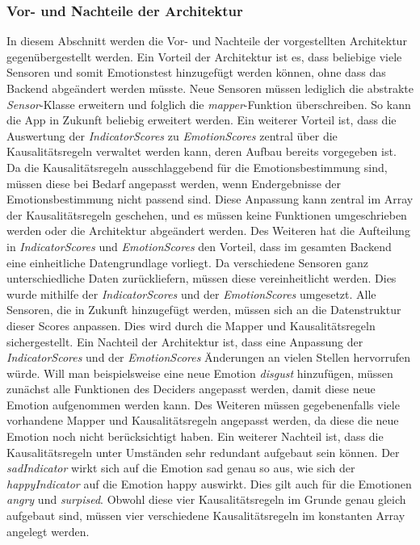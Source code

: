 \subsubsection{Vor- und Nachteile der Architektur} 
In diesem Abschnitt werden die Vor- und Nachteile der vorgestellten Architektur gegenübergestellt werden. \newline
Ein Vorteil der Architektur ist es, dass beliebige viele Sensoren und somit Emotionstest hinzugefügt werden können, ohne dass das Backend abgeändert werden müsste. Neue Sensoren müssen lediglich die abstrakte \textit{Sensor}-Klasse erweitern und folglich die \textit{mapper}-Funktion überschreiben. So kann die App in Zukunft beliebig erweitert werden. \newline
Ein weiterer Vorteil ist, dass die Auswertung der \textit{IndicatorScores} zu \textit{EmotionScores} zentral über die Kausalitätsregeln verwaltet werden kann, deren Aufbau bereits vorgegeben ist. Da die Kausalitätsregeln ausschlaggebend für die Emotionsbestimmung sind, müssen diese bei Bedarf angepasst werden, wenn Endergebnisse der Emotionsbestimmung nicht passend sind. Diese Anpassung kann zentral im Array der Kausalitätsregeln geschehen, und es müssen keine Funktionen umgeschrieben werden oder die Architektur abgeändert werden. \newline
Des Weiteren hat die Aufteilung in \textit{IndicatorScores} und \textit{EmotionScores} den Vorteil, dass im gesamten Backend eine einheitliche Datengrundlage vorliegt. Da verschiedene Sensoren ganz unterschiedliche Daten zurückliefern, müssen diese vereinheitlicht werden. Dies wurde mithilfe der \textit{IndicatorScores} und der \textit{EmotionScores} umgesetzt. Alle Sensoren, die in Zukunft hinzugefügt werden, müssen sich an die Datenstruktur dieser Scores anpassen. Dies wird durch die Mapper und Kausalitätsregeln sichergestellt. \newline
\newline
Ein Nachteil der Architektur ist, dass eine Anpassung der \textit{IndicatorScores} und der \textit{EmotionScores} Änderungen an vielen Stellen hervorrufen würde. Will man beispielsweise  eine neue Emotion \textit{disgust} hinzufügen, müssen zunächst alle Funktionen des Deciders angepasst werden, damit diese neue Emotion aufgenommen werden kann. Des Weiteren müssen gegebenenfalls viele vorhandene Mapper und Kausalitätsregeln angepasst werden, da diese die neue Emotion noch nicht berücksichtigt haben. \newline
 Ein weiterer Nachteil ist, dass die Kausalitätsregeln unter Umständen sehr redundant aufgebaut sein können. Der  \textit{sadIndicator} wirkt sich auf die Emotion sad genau so aus, wie sich der \textit{happyIndicator} auf die Emotion happy auswirkt. Dies gilt auch für die Emotionen \textit{angry} und \textit{surpised}. Obwohl diese vier Kausalitätsregeln im Grunde genau gleich aufgebaut sind, müssen vier verschiedene Kausalitätsregeln im konstanten Array angelegt werden. 
